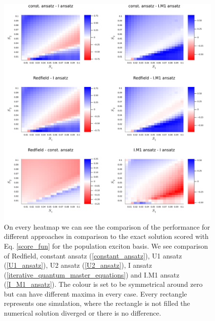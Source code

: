 \newpage
\begin{figure}[H]
\centering
\includegraphics[width=1.0\textwidth]{img/scans/hr_scan_2_scorediff_schexc22.png}
\caption{On every heatmap we can see the comparison of the performance for different approaches in comparison to the exact solution scored with Eq. \ref{score_fun} for the population exciton basis. We see comparison of Redfield, constant ansatz (\ref{constant_ansatz}), U1 ansatz (\ref{U1_ansatz}), U2 ansatz (\ref{U2_ansatz}), I ansatz (\ref{iterative_quantum_master_equations}) and I.M1 ansatz (\ref{I_M1_ansatz}). The colour is set to be symmetrical around zero but can have different maxima in every case. Every rectangle represents one simulation, where the rectangle is not filled the numerical solution diverged or there is no difference.}
\label{img:hr_scan_2_scorediff_schexc22}
\end{figure}

